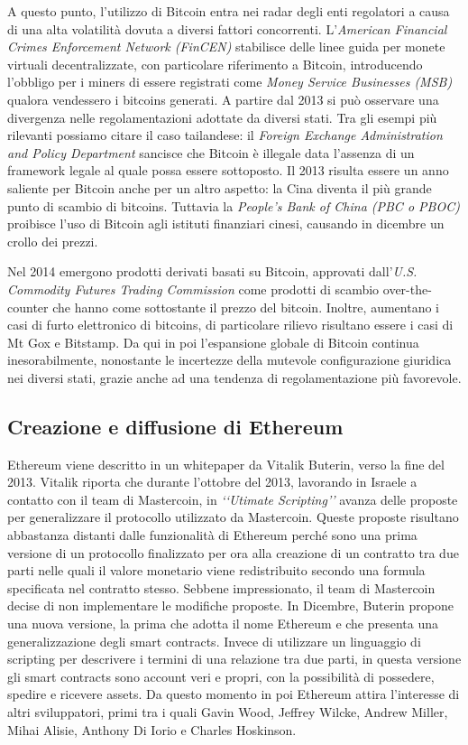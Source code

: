A questo punto, l'utilizzo di Bitcoin entra nei radar degli enti regolatori a causa di una alta volatilità dovuta a diversi fattori concorrenti. L'\textit{American Financial Crimes Enforcement Network (FinCEN)} stabilisce delle linee guida per monete virtuali decentralizzate, con particolare riferimento a Bitcoin, introducendo l'obbligo per i miners di essere registrati come \textit{Money Service Businesses (MSB)} qualora vendessero i bitcoins generati\cite{K17}. A partire dal 2013 si può osservare una divergenza nelle regolamentazioni adottate da diversi stati. 
Tra gli esempi più rilevanti possiamo citare il caso tailandese: il \textit{Foreign Exchange Administration and Policy Department} sancisce che Bitcoin è illegale data l'assenza di un framework legale al quale possa essere sottoposto\cite{K18}. Il 2013 risulta essere un anno saliente per Bitcoin anche per un altro aspetto: la Cina diventa il più grande punto di scambio di bitcoins. Tuttavia la \textit{People's Bank of China (PBC o PBOC)} proibisce l'uso di Bitcoin agli istituti finanziari cinesi, causando in dicembre un crollo dei prezzi\cite{K19}. 

Nel 2014 emergono prodotti derivati basati su Bitcoin, approvati dall'\textit{U.S. Commodity Futures Trading Commission} come prodotti di scambio over-the-counter che hanno come sottostante il prezzo del bitcoin. Inoltre, aumentano i casi di furto elettronico di bitcoins, di particolare rilievo risultano essere i casi di Mt Gox e Bitstamp. 
Da qui in poi l'espansione globale di Bitcoin continua inesorabilmente, nonostante le incertezze della mutevole configurazione giuridica nei diversi stati, grazie anche ad una tendenza di regolamentazione più favorevole.  

\subsection{Creazione e diffusione di Ethereum}

Ethereum viene descritto in un whitepaper\cite{K20} da Vitalik Buterin, verso la fine del 2013.
Vitalik riporta che durante l'ottobre del 2013, lavorando in Israele a contatto con il team di Mastercoin, in \textit{‘‘Utimate Scripting’’} avanza delle proposte per generalizzare il protocollo utilizzato da Mastercoin. Queste proposte risultano abbastanza distanti dalle funzionalità di Ethereum perché sono una prima versione di un protocollo finalizzato per ora alla creazione di un contratto tra due parti nelle quali il valore monetario viene redistribuito secondo una formula specificata nel contratto stesso. Sebbene impressionato, il team di Mastercoin decise di non implementare le modifiche proposte. In Dicembre, Buterin propone una nuova versione, la prima che adotta il nome Ethereum e che presenta una generalizzazione degli smart contracts. Invece di utilizzare un linguaggio di scripting per descrivere i termini di una relazione tra due parti, in questa versione gli smart contracts sono account veri e propri, con la possibilità di possedere, spedire e ricevere assets\cite{K21}. Da questo momento in poi Ethereum attira l'interesse di altri sviluppatori, primi tra i quali Gavin Wood, Jeffrey Wilcke, Andrew Miller, Mihai Alisie, Anthony Di Iorio e Charles Hoskinson. 

